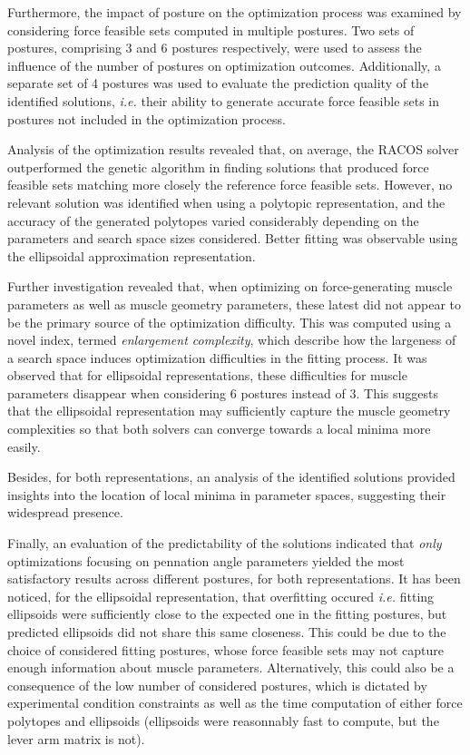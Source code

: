 Furthermore, the impact of posture on the optimization process was examined by considering force feasible sets computed in multiple postures. Two sets of postures, comprising 3 and 6 postures respectively, were used to assess the influence of the number of postures on optimization outcomes. Additionally, a separate set of 4 postures was used to evaluate the prediction quality of the identified solutions, \emph{i.e.} their ability to generate accurate force feasible sets in postures not included in the optimization process.

Analysis of the optimization results revealed that, on average, the RACOS solver outperformed the genetic algorithm in finding solutions that produced force feasible sets matching more closely the reference force feasible sets. However, no relevant solution was identified when using a polytopic representation, and the accuracy of the generated polytopes varied considerably depending on the parameters and search space sizes considered. Better fitting was observable using the ellipsoidal approximation representation.

Further investigation revealed that, when optimizing on force-generating muscle parameters as well as muscle geometry parameters, these latest did not appear to be the primary source of the optimization difficulty. This was computed using a novel index, termed \emph{enlargement complexity}, which describe how the largeness of a search space induces optimization difficulties in the fitting process. It was observed that for ellipsoidal representations, these difficulties for muscle parameters disappear when considering 6 postures instead of 3. This suggests that the ellipsoidal representation may sufficiently capture the muscle geometry complexities so that both solvers can converge towards a local minima more easily.

Besides, for both representations, an analysis of the identified solutions provided insights into the location of local minima in parameter spaces, suggesting their widespread presence.

Finally, an evaluation of the predictability of the solutions indicated that \emph{only} optimizations focusing on pennation angle parameters yielded the most satisfactory results across different postures, for both representations. It has been noticed, for the ellipsoidal representation, that overfitting occured \emph{i.e.} fitting ellipsoids were sufficiently close to the expected one in the fitting postures, but predicted ellipsoids did not share this same closeness. This could be due to the choice of considered fitting postures, whose force feasible sets may not capture enough information about muscle parameters. Alternatively, this could also be a consequence of the low number of considered postures, which is dictated by experimental condition constraints as well as the time computation of either force polytopes and ellipsoids (ellipsoids were reasonnably fast to compute, but the lever arm matrix is not).


